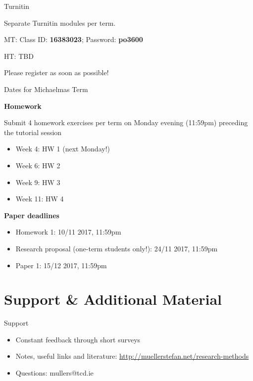 \documentclass[10pt]{beamer}
\begin{document}
\begin{frame}{Turnitin}

Separate Turnitin modules per term.

MT: Class ID: \textbf{16383023}; Password: \textbf{po3600}

HT: TBD

Please register as soon as possible!
\end{frame}

\begin{frame}{Dates for Michaelmas Term}

\textbf{Homework}

Submit 4 homework exercises per term on Monday evening (11:59pm) preceding the tutorial session

\begin{itemize}
\item Week 4: HW 1 (next Monday!)
\item Week 6: HW 2
\item Week 9: HW 3
\item Week 11: HW 4
\end{itemize}

\textbf{Paper deadlines}

\begin{itemize}
\item Homework 1: 10/11 2017, 11:59pm
\item Research proposal (one-term students only!): 24/11 2017, 11:59pm
\item Paper 1: 15/12 2017, 11:59pm
\end{itemize}

\end{frame}

\section{Support \& Additional Material}

\begin{frame}{Support}

\begin{itemize}
\item Constant feedback through short surveys%
\item Notes, useful links and literature: \url{http://muellerstefan.net/research-methods}
\item Questions: mullers@tcd.ie
\end{itemize}

\end{frame}
\end{document}

